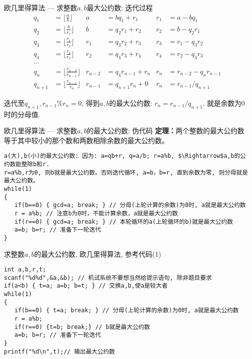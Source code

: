 \begin{frame}{欧几里得算法 --- 求整数$a,b$最大公约数: 迭代过程}
\vspace{-1cm}
\begin{align*}
q_1&=\lfloor\frac{a}{b}\rfloor		& a&=bq_1+r_1    	& r_1&=a-bq_1\\
q_2&=\lfloor\frac{b}{r_1}\rfloor 	& b&=q_2r_1+r_2  	& r_2&=b-q_2r_1\\
q_3&=\lfloor\frac{r_1}{r_2}\rfloor 	& r_1&=q_3r_2+r_3  	& r_3&=r_1-q_3r_2\\
q_4&=\lfloor\frac{r_2}{r_3}\rfloor 	& r_2&=q_4r_3+r_4  	& r_4&=r_2-q_4r_3\\
\cdots\\
q_n&=\lfloor\frac{r_{n-2}}{r_{n-1}}\rfloor 	& r_{n-2}&=q_4r_{n-1}+r_n  	& r_n&=r_{n-2}-q_nr_{n-1}\\
q_{n+1}&=\lfloor\frac{r_{n-1}}{r_{n}}\rfloor 	& r_{n-1}&=q_{n+1}r_{n}+0  	& r_n&=r_{n-1}/q_{n+1} 
\end{align*}

迭代至$q_{n+1}, r_{n-1}\%r_n=0$, 得到$a,b$的最大公约数: $r_n=r_{n-1}/q_{n+1}$. 就是余数为0时的分母值.
\end{frame}

\begin{frame}[fragile]{欧几里得算法 --- 求整数$a,b$的最大公约数: 伪代码}
\textbf{定理：}两个整数的最大公约数等于其中较小的那个数和两数相除余数的最大公约数。

\medskip
\begin{lstlisting}
a(大),b(小)的最大公约数: 因为: a=qb+r, q=a/b; r=a%b, $\Rightarrow$a,b的公约数能整除b和r.
r=a%b,r为0, 则b就是最大公约数。否则迭代循环, a=b，b=r, 直到余数为零, 则分母就是最大公约数。 
while(1)
{
   if(b==0) { gcd=a; break; } // 分母(上轮计算的余数)为0时, a就是最大公约数
   r = a%b; // 注意b为0时，不能计算余数，a就是最大公约数
   if(r==0) { gcd=a; break; } // 本轮循环的a(上轮循环的b)就是最大公约数
   a=b; b=r; // 准备下一轮迭代    
}
\end{lstlisting}
\end{frame}

\begin{frame}{求整数$a,b$的最大公约数, 欧几里得算法, 参考代码(1)}
\begin{lstlisting}
int a,b,r,t;
scanf("%d%d",&a,&b); // 机试系统不要想当然给提示语句, 除非题目要求
if(a<b) { t=a; a=b; b=t; } // 交换a,b,使a是较大者
while(1)
{
   if(b==0) { t=a; break; } // 分母(上轮计算的余数)为0时, a就是最大公约数
   r = a%b; 
   if(r==0) {t=b; break;} // b就是最大公约数
   a=b; b=r; // 准备下一轮迭代   
}
printf("%d\n",t);// 输出最大公约数
\end{lstlisting}
\end{frame}

